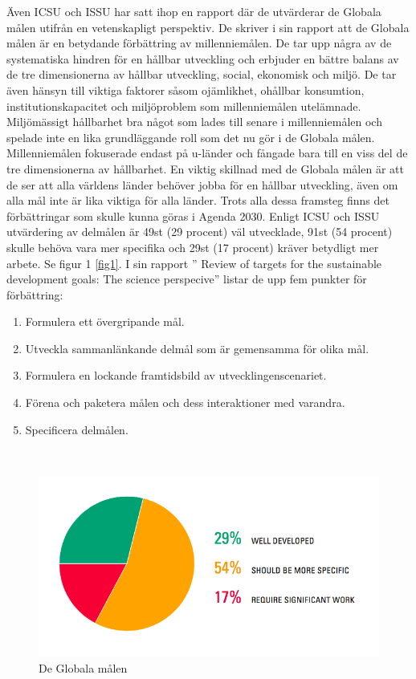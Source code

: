 \documentclass{report}
\begin{document}
Även ICSU och ISSU har satt ihop en rapport där de utvärderar de Globala målen utifrån en vetenskapligt perspektiv. De skriver i sin rapport att de Globala målen är en betydande förbättring av millenniemålen.  De tar upp några av de systematiska hindren för en hållbar utveckling och erbjuder en bättre balans av de tre dimensionerna av hållbar utveckling, social, ekonomisk och miljö. De tar även hänsyn till viktiga faktorer såsom ojämlikhet, ohållbar konsumtion, institutionskapacitet och miljöproblem som millenniemålen utelämnade. Miljömässigt hållbarhet bra något som lades till senare i millenniemålen och spelade inte en lika grundläggande roll som det nu gör i de Globala målen. Millenniemålen fokuserade endast på u-länder och fångade bara till en viss del de tre dimensionerna av hållbarhet. En viktig skillnad med de Globala målen är att de ser att alla världens länder behöver jobba för en hållbar utveckling, även om alla mål inte är lika viktiga för alla länder. Trots alla dessa framsteg finns det förbättringar som skulle kunna göras i Agenda 2030. Enligt ICSU och ISSU utvärdering av delmålen är 49st (29 procent) väl utvecklade, 91st (54 procent) skulle behöva vara mer specifika och 29st (17 procent) kräver betydligt mer arbete. Se figur 1 \ref{fig1}. 
I sin rapport ” Review of targets for the sustainable development goals: The science perspecive” listar de upp fem punkter för förbättring:  

\begin{enumerate} \label{forbattring}
\item Formulera ett övergripande mål.
\label{improvment1}
\item Utveckla sammanlänkande delmål som är gemensamma för olika mål. 
\label{improvment2}
 \item Formulera en lockande framtidsbild av utvecklingenscenariet.
 \label{improvment3} 
\item Förena och paketera målen och dess interaktioner med varandra. \label{improvment4}
\item Specificera delmålen.
\label{improvment5}
\end{enumerate} 
\cite{review}\\

\begin{figure}[h] \label{fig1}
\label{improvments}
\includegraphics[width=\linewidth]{improvments.png}
\caption{De Globala målen \cite{review}} 
\end{figure}
\end{document}

